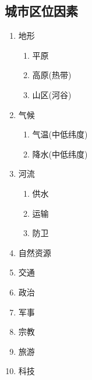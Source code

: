 \documentclass[a4paper]{article}
\begin{document}
    \subsection{城市区位因素}
    \begin{enumerate}
        \item 地形
        \begin{enumerate}
            \item 平原
            \item 高原(热带)
            \item 山区(河谷)
        \end{enumerate}
        \item 气候
        \begin{enumerate}
            \item 气温(中低纬度)
            \item 降水(中低纬度)
        \end{enumerate}
        \item 河流
        \begin{enumerate}
            \item 供水
            \item 运输
            \item 防卫
        \end{enumerate}
        \item 自然资源
        \item 交通
        \item 政治
        \item 军事
        \item 宗教
        \item 旅游
        \item 科技
    \end{enumerate}
\end{document}
